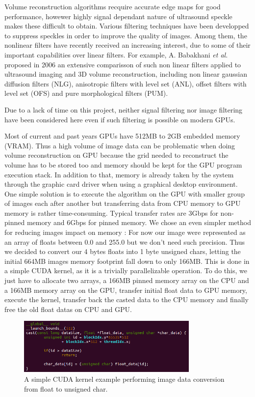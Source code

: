 \documentclass[12pt,journal,compsoc]{IEEEtran}
\begin{document}
Volume reconstruction algorithms recquire accurate edge maps for good performance, howewer highly signal dependant nature of ultrasound speckle makes these difficult to obtain. Various filtering techniques have been developped to suppress speckles in order to improve the quality of images. 
Among them, the nonlinear filters have recently received an increasing interest, due to some of their important capabilities over linear filters. For example, A. Babakhani \textit{et al.}\cite{1} proposed in 2006 an extensive comparisson of such non linear filters applied to ultrasound imaging and 3D volume reconstruction, including non linear gaussian diffusion filters (NLG), anisotropic filters with level set (ANL), offset filters with level set (OFS) and pure morphological filters (PUM).\par

Due to a lack of time on this project, neither signal filtering nor image filtering have been considered here even if such filtering is possible on modern GPUs.

Most of current and past years GPUs have 512MB to 2GB embedded memory (VRAM). Thus a high volume of image data can be problematic when doing volume reconstruction on GPU because the grid needed to reconstruct the volume has to be stored too and memory should be kept for the GPU program execution stack. In addition to that, memory is already taken by the system through the graphic card driver when using a graphical desktop environment. 
One simple solution is to execute the algorithm on the GPU with smaller group of images each after another but transferring data from CPU memory to GPU memory is rather time-consuming. 
Typical transfer rates are 3Gbps for non-pinned memory and 6Gbps for pinned memory.
We chose an even simpler method for reducing images impact on memory : For now our image were represented as an array of floats between 0.0 and 255.0 but we don't need such precision. Thus we decided to convert our 4 bytes floats into 1 byte unsigned chars, letting the initial 664MB images memory footprint fall down to only 166MB. This is done in a simple CUDA kernel, as it is a trivially parallelizable operation. To do this, we just have to allocate two arrays, a 166MB pinned memory array on the CPU and a 166MB memory array on the GPU, transfer initial float data to GPU memory, execute the kernel, transfer back the casted data to the CPU memory and finally free the old float datas on CPU and GPU. 

\begin{figure}[!h]
\centering
\includegraphics[width=3.5in]{simple_kernel}
\caption{A simple CUDA kernel example performing image data conversion from float to unsigned char.}
\label{kernel}
\end{figure}
\end{document}
